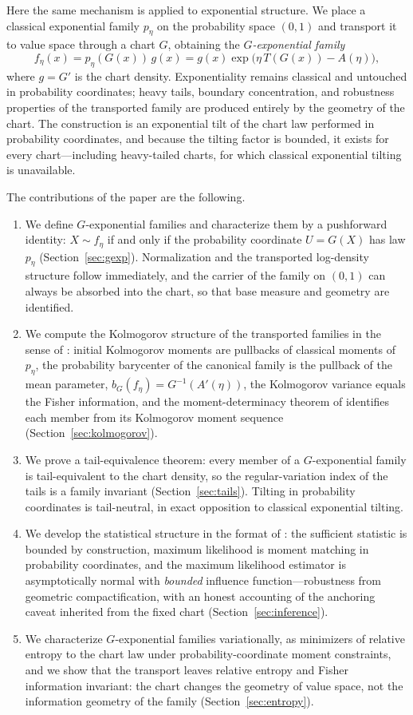 \documentclass[11pt]{article}
\theoremstyle{definition}
\begin{document}
Here the same mechanism is applied to exponential structure. We place a
classical exponential family $p_\eta$ on the probability space $(0,1)$ and
transport it to value space through a chart $G$, obtaining the
\emph{$G$-exponential family}
\[
f_\eta(x)=p_\eta(G(x))\,g(x)
        =g(x)\exp\bigl(\eta\,T(G(x))-A(\eta)\bigr),
\]
where $g=G'$ is the chart density. Exponentiality remains classical and
untouched in probability coordinates; heavy tails, boundary concentration,
and robustness properties of the transported family are produced entirely
by the geometry of the chart. The construction is an exponential tilt of
the chart law performed in probability coordinates, and because the tilting
factor is bounded, it exists for every chart---including heavy-tailed
charts, for which classical exponential tilting is unavailable.

The contributions of the paper are the following.
\begin{enumerate}[leftmargin=2em]
\item We define $G$-exponential families and characterize them by a
pushforward identity: $X\sim f_\eta$ if and only if the probability
coordinate $U=G(X)$ has law $p_\eta$
(Section~\ref{sec:gexp}). Normalization and the transported log-density
structure follow immediately, and the carrier of the family on $(0,1)$ can
always be absorbed into the chart, so that base measure and geometry are
identified.
\item We compute the Kolmogorov structure of the transported families in
the sense of \cite{Cojocea2026a}: initial Kolmogorov moments are pullbacks
of classical moments of $p_\eta$, the probability barycenter of the
canonical family is the pullback of the mean parameter,
$b_G(f_\eta)=G^{-1}(A'(\eta))$, the Kolmogorov variance equals the Fisher
information, and the moment-determinacy theorem of \cite{Cojocea2026a}
identifies each member from its Kolmogorov moment sequence
(Section~\ref{sec:kolmogorov}).
\item We prove a tail-equivalence theorem: every member of a
$G$-exponential family is tail-equivalent to the chart density, so the
regular-variation index of the tails is a family invariant
(Section~\ref{sec:tails}). Tilting in probability coordinates is
tail-neutral, in exact opposition to classical exponential tilting.
\item We develop the statistical structure in the format of
\cite{Cojocea2026b}: the sufficient statistic is bounded by construction,
maximum likelihood is moment matching in probability coordinates, and the
maximum likelihood estimator is asymptotically normal with \emph{bounded}
influence function---robustness from geometric compactification, with an
honest accounting of the anchoring caveat inherited from the fixed chart
(Section~\ref{sec:inference}).
\item We characterize $G$-exponential families variationally, as
minimizers of relative entropy to the chart law under probability-coordinate
moment constraints, and we show that the transport leaves relative entropy
and Fisher information invariant: the chart changes the geometry of value
space, not the information geometry of the family
(Section~\ref{sec:entropy}).
\end{enumerate}
\end{document}
